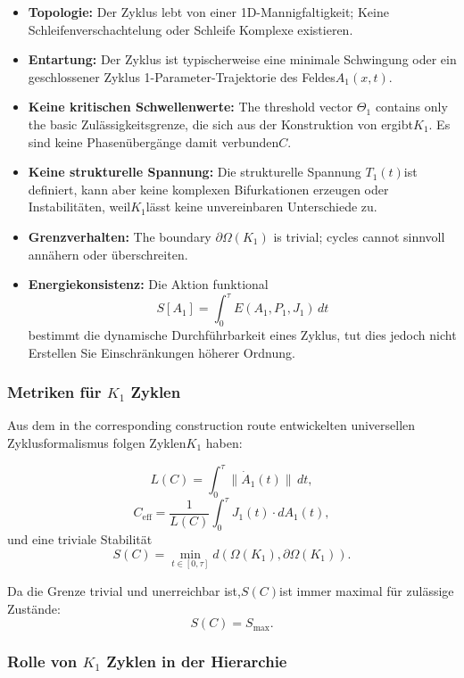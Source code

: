 \begin{itemize}
  \item \textbf{Topologie:}
Der Zyklus lebt von einer 1D-Mannigfaltigkeit; Keine Schleifenverschachtelung oder Schleife
Komplexe existieren.

  \item \textbf{Entartung:}
Der Zyklus ist typischerweise eine minimale Schwingung oder ein geschlossener Zyklus
1-Parameter-Trajektorie des Feldes$A_1(x,t)$.

  \item \textbf{Keine kritischen Schwellenwerte:}
        The threshold vector $\Theta_1$ contains only the basic
Zulässigkeitsgrenze, die sich aus der Konstruktion von ergibt$K_1$.
Es sind keine Phasenübergänge damit verbunden$C$.

  \item \textbf{Keine strukturelle Spannung:}
Die strukturelle Spannung
$T_1(t)$ist definiert, kann aber keine komplexen Bifurkationen erzeugen oder
Instabilitäten, weil$K_1$lässt keine unvereinbaren Unterschiede zu.

  \item \textbf{Grenzverhalten:}
        The boundary $\partial\Omega(K_1)$ is trivial; cycles cannot
sinnvoll annähern oder überschreiten.

  \item \textbf{Energiekonsistenz:}
Die Aktion funktional
        \[
          S[A_1] = \int_0^\tau E(A_1,P_1,J_1)\, dt
        \]
bestimmt die dynamische Durchführbarkeit eines Zyklus, tut dies jedoch nicht
Erstellen Sie Einschränkungen höherer Ordnung.
\end{itemize}

\subsubsection{Metriken für \texorpdfstring{$K_1$}{K_1} Zyklen}

Aus dem in the corresponding construction route entwickelten universellen Zyklusformalismus folgen Zyklen$K_1$
haben:

\[
  L(C) = \int_0^\tau \| \dot{A}_1(t) \|\, dt,
\]
\[
  C_{\mathrm{eff}} =
    \frac{1}{L(C)} \int_0^\tau J_1(t)\cdot dA_1(t),
\]
und eine triviale Stabilität
\[
  S(C) = \min_{t\in[0,\tau]} d(\Omega(K_1),\partial\Omega(K_1)).
\]

Da die Grenze trivial und unerreichbar ist,$S(C)$ist immer
maximal für zulässige Zustände:
\[
  S(C) = S_{\max}.
\]

\subsubsection{Rolle von \texorpdfstring{$K_1$}{K_1} Zyklen in der Hierarchie}

